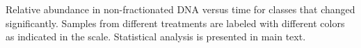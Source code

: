 Relative abundance in non-fractionated DNA versus time for classes that changed significantly.
Samples from different treatments are labeled with different colors as
indicated in the scale. Statistical analysis is presented in main text.

